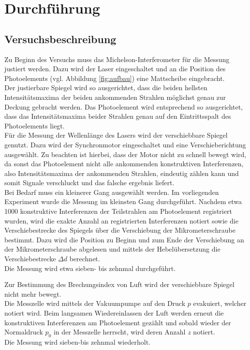 \section{Durchführung}
\label{sec:Durchführung}



\subsection{Versuchsbeschreibung}
\label{sec:Versuchsbeschreibung}
Zu Beginn des Versuchs muss das Michelson-Interferometer für die Messung justiert werden.
Dazu wird der Laser eingeschaltet und an die Position des Photoelements (vgl. Abbildung \ref{fig:aufbau}) eine Mattscheibe eingebracht.\\
Der justierbare Spiegel wird so ausgerichtet, dass die beiden hellsten Intensitätsmaxima der beiden ankommenden Strahlen möglichst genau zur Deckung gebracht werden. Das Photoelement wird entsprechend so ausgerichtet, dass das Intensitätsmaxima beider Strahlen genau auf den Eintrittsspalt des Photoelements liegt.
\\Für die Messung der Wellenlänge des Lasers wird der verschiebbare Spiegel genutzt.
Dazu wird der Synchronmotor eingeschaltet und eine Verschieberichtung ausgewählt.
Zu beachten ist hierbei, dass der Motor nicht zu schnell bewegt wird, da sonst das Photoelement nicht alle ankommenden konstruktiven Interferenzen, also Intensitätsmaxima der ankommenden Strahlen, eindeutig zählen kann und somit Signale verschluckt und das falsche ergebnis liefert.
\\Bei Bedarf muss ein kleinerer Gang ausgewählt werden. Im vorliegenden Experiment wurde die Messung im kleinsten Gang durchgeführt.
Nachdem etwa 1000 konstruktive Interferenzen der Teilstrahlen am Photoelement registriert wurden, wird die exakte Anzahl an registrierten Interferenzen notiert sowie die Verschiebestrecke des Spiegels über die Verschiebung der Mikrometerschraube bestimmt. Dazu wird die Position zu Beginn und zum Ende der Verschiebung an der Mikrometerschraube abgelesen und mittels der Hebelübersetzung die Verschiebestrecke $\Delta d$ berechnet.
\\Die Messung wird etwa sieben- bis zehnmal durchgeführt.

Zur Bestimmung des Brechungsindex von Luft wird der verschiebbare Spiegel nicht mehr bewegt.\\
Die Messzelle wird mittels der Vakuumpumpe auf den Druck $p$ evakuiert, welcher notiert wird. Beim langsamen Wiedereinlassen der Luft werden erneut die konstruktiven Interferenzen am Photoelement gezählt und sobald wieder der Normaldruck $p_{\mathrm{0}}$ in der Messzelle herrscht, wird deren Anzahl $z$ notiert. \\Die Messung wird sieben-bis zehnmal wiederholt.

